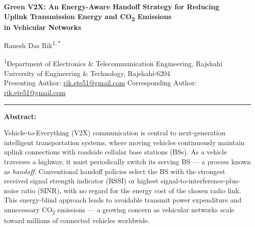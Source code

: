 \documentclass[10pt, a4paper]{article}
\begin{document}
\linespread{0.96}\selectfont


\begin{center}
  {\fontsize{12}{14}\selectfont\bfseries
  Green V2X: An Energy-Aware Handoff Strategy for Reducing\\[0.5pt]
  Uplink Transmission Energy and CO\textsubscript{2} Emissions\\[0.5pt]
  in Vehicular Networks}
\end{center}

\vspace{1pt}

\begin{center}
  {\fontsize{10}{12}\selectfont
  Ranesh Das Rik\textsuperscript{1,\,*}
  }
\end{center}

\vspace{1pt}

\begin{center}
  {\fontsize{9}{11}\selectfont
  \textsuperscript{1}Department of Electronics \& Telecommunication Engineering,
  Rajshahi University of Engineering \& Technology, Rajshahi-6204\\[1pt]
  Presenting Author: \href{mailto:rik.ete51@gmail.com}{rik.ete51@gmail.com}
  \quad *Corresponding Author: \href{mailto:rik.ete51@gmail.com}{rik.ete51@gmail.com}
  }
\end{center}

\vspace{2pt}
\hrule
\vspace{2pt}

\noindent\textbf{Abstract:}

Vehicle-to-Everything (V2X) communication is central to next-generation intelligent
transportation systems, where moving vehicles continuously maintain uplink connections
with roadside cellular base stations (BSs). As a vehicle traverses a highway, it must
periodically switch its serving BS --- a process known as \textit{handoff}. Conventional
handoff policies select the BS with the strongest received signal strength indicator (RSSI)
or highest signal-to-interference-plus-noise ratio (SINR), with no regard for the energy
cost of the chosen radio link. This energy-blind approach leads to avoidable transmit power
expenditure and unnecessary CO\textsubscript{2} emissions --- a growing concern as
vehicular networks scale toward millions of connected vehicles worldwide.
\end{document}
